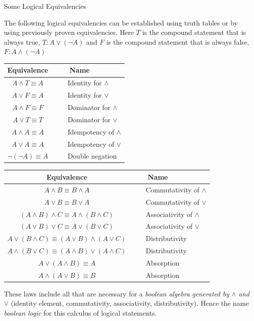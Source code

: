 \documentclass[smaller,hyperref={CJKbookmarks=true}]{beamer}
\begin{document}
\begin{frame}{Some Logical Equivalencies}
\begin{spacing}{1.05}
The following logical equivalencies can be established using truth tables or
by using previously proven equivalencies. Here $T$ is the compound statement that is always true, $T\!:A\vee(\neg A)$ and $F$ is the compound statement that is always false, $F\!:A\wedge(\neg A)$
\begin{center}
  \begin{tabular}{cl}\toprule
    Equivalence &~~~ Name \\ \midrule
    $A\wedge T\equiv A$ &~~~ Identity for $\wedge$ \\
    $A\vee F\equiv A$ &~~~ Identity for $\vee$ \\ \midrule
    $A\wedge F\equiv F$ &~~~ Dominator for $\wedge$ \\
    $A\vee T\equiv T$ &~~~ Dominator for $\vee$ \\ \midrule
    $A\wedge A\equiv A$ &~~~ Idempotency of $\wedge$ \\
    $A\vee A\equiv A$ &~~~ Idempotency of $\vee$ \\ \midrule
    $\neg(\neg A)\equiv A$ &~~~ Double negation \\
  \bottomrule
  \end{tabular}
\newpage
\begin{tabular}{cl}
  \toprule
  Equivalence &~~~ Name \\ \midrule
  $A\wedge B\equiv B\wedge A$ &~~~ Commutativity of $\wedge$ \\
  $A\vee B\equiv B\vee A$ &~~~ Commutativity of $\vee$ \\ \midrule
  $(A\wedge B)\wedge C\equiv A\wedge(B\wedge C)$ &~~~ Associativity of $\wedge$ \\
  $(A\vee B)\vee C\equiv A\vee(B\vee C)$ &~~~ Associativity of $\vee$ \\ \midrule
  $A\vee(B\wedge C)\equiv(A\vee B)\wedge(A\vee C)$ &~~~ Distributivity \\
  $A\wedge(B\vee C)\equiv(A\wedge B)\vee(A\wedge C)$ &~~~ Distributivity \\ \midrule
  $A\vee(A\wedge B)\equiv A$ &~~~ Absorption \\
  $A\wedge(A\vee B)\equiv B$ &~~~ Absorption \\
  \bottomrule
\end{tabular}
\end{center}
These laws include all that are necessary for a \emph{boolean algebra generated by $\wedge$ and $\vee$} (identity element, commutativity, associativity, distributivity). Hence the name \emph{boolean logic} for this calculus of logical statements.

\end{spacing}
\end{frame}
\end{document}
